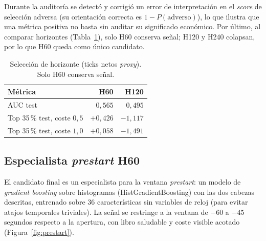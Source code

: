 Durante la auditoría se detectó y corrigió un error de interpretación en el \emph{score} de
selección adversa (su orientación correcta es $1 - P(\text{adverso})$), lo que ilustra que
una métrica positiva no basta sin auditar su significado económico. Por último, al comparar
horizontes (Tabla~\ref{tab:horizonte}), solo H60 conserva señal; H120 y H240 colapsan, por
lo que H60 queda como único candidato.

\begin{table}[h]
\centering
\caption{Selección de horizonte (ticks netos \emph{proxy}). Solo H60 conserva señal.}
\label{tab:horizonte}
\begin{tabular}{lrr}
\toprule
\textbf{Métrica} & \textbf{H60} & \textbf{H120} \\
\midrule
AUC test                       & $0{,}565$ & $0{,}495$ \\
Top 35\,\% test, coste $0{,}5$ & $+0{,}426$ & $-1{,}117$ \\
Top 35\,\% test, coste $1{,}0$ & $+0{,}058$ & $-1{,}491$ \\
\bottomrule
\end{tabular}
\end{table}

\subsection{Especialista \emph{prestart} H60}

El candidato final es un especialista para la ventana \emph{prestart}: un modelo de
\emph{gradient boosting} sobre histogramas (HistGradientBoosting) con las dos cabezas
descritas, entrenado sobre 36 características sin variables de reloj (para evitar atajos
temporales triviales). La señal se restringe a la ventana de $-60$ a $-45$ segundos respecto
a la apertura, con libro saludable y coste visible acotado (Figura~\ref{fig:prestart}).

